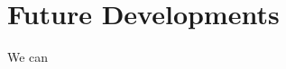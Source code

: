\documentclass[12pt]{article}
\begin{document}
\section{Future Developments}
\par
We can






\newpage
\begin{appendix}
    \listoffigures
    \listoftables
    \listoflistings
    \printbibliography
\end{appendix}
\end{document}
